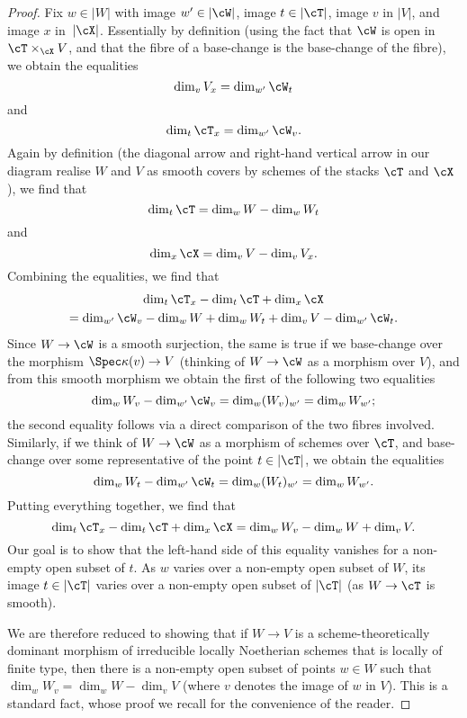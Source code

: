 \begin{proof}
        Fix $w \in |W|$ with image $w' \in |\cW|$,
	image $t \in |\cT|$, image $v$ in $|V|$,
	and image $x$ in~$|\cX|$.
	Essentially by definition (using the
	fact that $\cW$ is open in $\cT\times_{\cX} V$, and that
	the fibre of a base-change is the base-change of the fibre),
	we obtain the equalities
	$$\dim_v V_x = \dim_{w'} \cW_t $$
	and
        $$ \dim_t \cT_x = \dim_{w'} \cW_v.$$
        Again by definition (the diagonal arrow and right-hand vertical
	arrow in our diagram realise $W$ and $V$ as smooth covers by 
	schemes of the stacks $\cT$ and $\cX$), we find that 
	$$\dim_t \cT = \dim_w W - \dim_w W_t $$
	and
	$$ \dim_x \cX = \dim_v V - \dim_v V_x.$$
	Combining the equalities, we find that
	\begin{multline*}
	\dim_t \cT_x - \dim_t \cT + \dim_x \cX
	\\
	= \dim_{w'} \cW_v - \dim_w W + \dim_w W_t + \dim_v V - \dim_{w'} \cW_t.
	\end{multline*}
	Since $W \to \cW$ is a smooth surjection, the same is true 
	if we base-change over the morphism $\Spec \kappa(v) \to V$
	(thinking of $W \to \cW$ as a morphism over $V$),
	and from this smooth morphism we obtain the first of the following
	two equalities
	$$\dim_w W_v - \dim_{w'} \cW_v = \dim_w (W_v)_{w'} = \dim_w W_{w'};$$
	the second equality follows via a direct comparison of the
	two fibres involved.
	Similarly, if we think of $W \to \cW$ as a morphism of schemes
	over $\cT$, and base-change over some representative of the point
	$t \in |\cT|$, we obtain the equalities
	$$\dim_w W_t - \dim_{w'} \cW_t = \dim_w (W_t)_{w'} = \dim_w W_{w'}.$$
	Putting everything together, we find that
	$$
	\dim_t \cT_x - \dim_t \cT + \dim_x \cX
	=  \dim_w W_v - \dim_w W + \dim_v V.
	$$
	Our goal is to show that the left-hand side of this equality
	vanishes for a non-empty open subset
	of $t$.  As $w$ varies over a non-empty open subset of $W$,
	its image $t \in |\cT|$ varies over a non-empty open
	subset of $|\cT|$ (as $W \to \cT$ is smooth).  

We are therefore reduced to showing that if $W\to V$ is a
scheme-theoretically dominant morphism of irreducible locally
Noetherian schemes that is locally of finite type,
then there is a non-empty open subset of
points $w\in W$ such that $\dim_w W_v =\dim_w W - \dim_v V$
(where $v$ denotes the image of $w$ in $V$).
This is a standard fact,
whose proof we recall for the convenience of the reader.


\end{proof}
